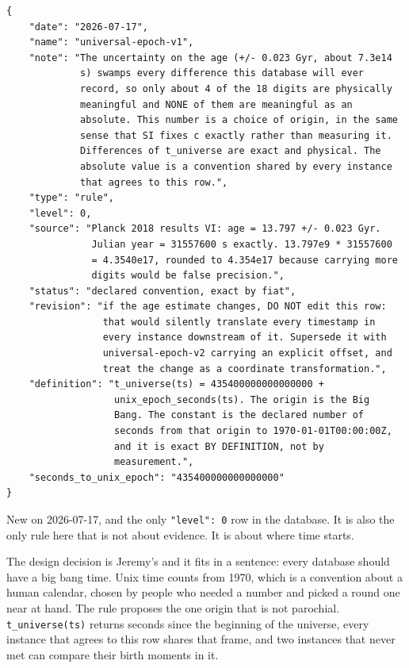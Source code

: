 \begin{lstlisting}[language={},basicstyle=\ttfamily\footnotesize]
{
    "date": "2026-07-17",
    "name": "universal-epoch-v1",
    "note": "The uncertainty on the age (+/- 0.023 Gyr, about 7.3e14
             s) swamps every difference this database will ever
             record, so only about 4 of the 18 digits are physically
             meaningful and NONE of them are meaningful as an
             absolute. This number is a choice of origin, in the same
             sense that SI fixes c exactly rather than measuring it.
             Differences of t_universe are exact and physical. The
             absolute value is a convention shared by every instance
             that agrees to this row.",
    "type": "rule",
    "level": 0,
    "source": "Planck 2018 results VI: age = 13.797 +/- 0.023 Gyr.
               Julian year = 31557600 s exactly. 13.797e9 * 31557600
               = 4.3540e17, rounded to 4.354e17 because carrying more
               digits would be false precision.",
    "status": "declared convention, exact by fiat",
    "revision": "if the age estimate changes, DO NOT edit this row:
                 that would silently translate every timestamp in
                 every instance downstream of it. Supersede it with
                 universal-epoch-v2 carrying an explicit offset, and
                 treat the change as a coordinate transformation.",
    "definition": "t_universe(ts) = 435400000000000000 +
                   unix_epoch_seconds(ts). The origin is the Big
                   Bang. The constant is the declared number of
                   seconds from that origin to 1970-01-01T00:00:00Z,
                   and it is exact BY DEFINITION, not by
                   measurement.",
    "seconds_to_unix_epoch": "435400000000000000"
}
\end{lstlisting}

New on 2026-07-17, and the only \texttt{"level": 0} row in the database. It is also the only rule here that is not about evidence. It is about where time starts.

The design decision is Jeremy's and it fits in a sentence: every database should have a big bang time. Unix time counts from 1970, which is a convention about a human calendar, chosen by people who needed a number and picked a round one near at hand. The rule proposes the one origin that is not parochial. \texttt{t\_universe(ts)} returns seconds since the beginning of the universe, every instance that agrees to this row shares that frame, and two instances that never met can compare their birth moments in it.

